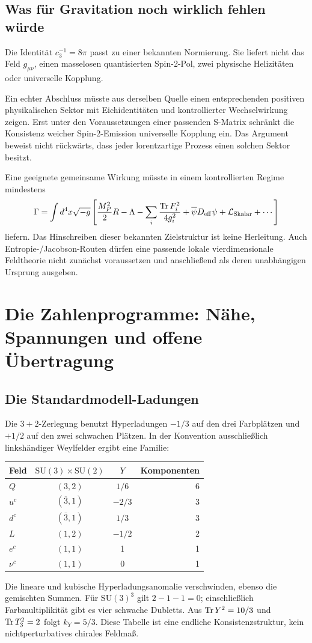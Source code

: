 \section{Was für Gravitation noch wirklich fehlen würde}
Die Identität $c_3^{-1}=8\pi$ passt zu einer bekannten Normierung. Sie liefert nicht das Feld $g_{\mu\nu}$, einen masselosen quantisierten Spin-2-Pol, zwei physische Helizitäten oder universelle Kopplung.

Ein echter Abschluss müsste aus derselben Quelle einen entsprechenden positiven physikalischen Sektor mit Eichidentitäten und kontrollierter Wechselwirkung zeigen. Erst unter den Voraussetzungen einer passenden S-Matrix schränkt die Konsistenz weicher Spin-2-Emission universelle Kopplung ein. Das Argument beweist nicht rückwärts, dass jeder lorentzartige Prozess einen solchen Sektor besitzt.

Eine geeignete gemeinsame Wirkung müsste in einem kontrollierten Regime mindestens
\begin{equation}
\Gamma=\int d^4x\sqrt{-g}\left[
\frac{M_P^2}{2}R-\Lambda-\sum_i\frac{\operatorname{Tr} F_i^2}{4g_i^2}
+\overline\psi D_{\mathrm{eff}}\psi+\mathcal L_{\mathrm{Skalar}}+\cdots\right]
\end{equation}
liefern. Das Hinschreiben dieser bekannten Zielstruktur ist keine Herleitung. Auch Entropie-/Jacobson-Routen dürfen eine passende lokale vierdimensionale Feldtheorie nicht zunächst voraussetzen und anschließend als deren unabhängigen Ursprung ausgeben.

\chapter{Die Zahlenprogramme: Nähe, Spannungen und offene Übertragung}
\label{ch:zahlen}
\section{Die Standardmodell-Ladungen}
Die $3+2$-Zerlegung benutzt Hyperladungen $-1/3$ auf den drei Farbplätzen und $+1/2$ auf den zwei schwachen Plätzen. In der Konvention ausschließlich linkshändiger Weylfelder ergibt eine Familie:
\begin{center}
\begin{tabular}{lccr}
\toprule Feld&$\mathrm{SU}(3)\times\mathrm{SU}(2)$&$Y$&Komponenten\\\midrule
$Q$&$(3,2)$&$1/6$&6\\
$u^c$&$(\overline3,1)$&$-2/3$&3\\
$d^c$&$(\overline3,1)$&$1/3$&3\\
$L$&$(1,2)$&$-1/2$&2\\
$e^c$&$(1,1)$&1&1\\
$\nu^c$&$(1,1)$&0&1\\\bottomrule
\end{tabular}
\end{center}
Die lineare und kubische Hyperladungsanomalie verschwinden, ebenso die gemischten Summen. Für $\mathrm{SU}(3)^3$ gilt $2-1-1=0$; einschließlich Farbmultiplikität gibt es vier schwache Dubletts. Aus $\operatorname{Tr} Y^2=10/3$ und $\operatorname{Tr} T_3^2=2$ folgt $k_Y=5/3$. Diese Tabelle ist eine endliche Konsistenzstruktur, kein nichtperturbatives chirales Feldmaß. 

